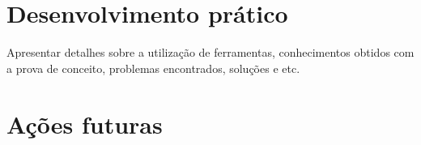 \section{Desenvolvimento prático} %
\label{sec:desenvolvimento_prático}

	Apresentar detalhes sobre a utilização de ferramentas, conhecimentos obtidos com a prova de conceito, problemas encontrados, soluções e etc.

\section{Ações futuras} %
\label{sec:acoes_futuras}

